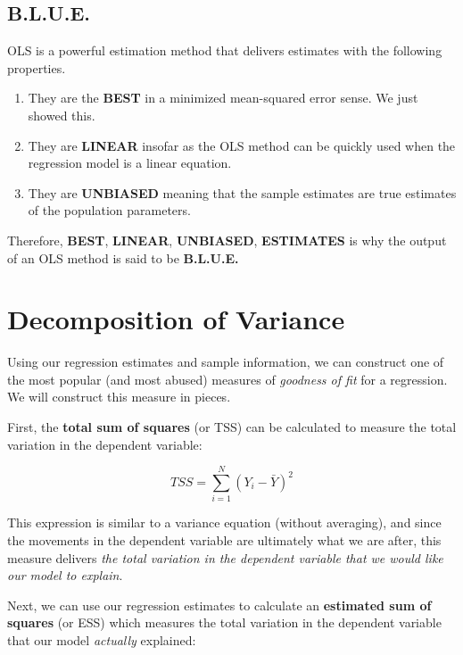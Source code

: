 \documentclass[
]{book}
\begin{document}
\hypertarget{b.l.u.e.}{%
\subsection{B.L.U.E.}\label{b.l.u.e.}}

OLS is a powerful estimation method that delivers estimates with the following properties.

\begin{enumerate}
\def\labelenumi{\arabic{enumi}.}
\item
  They are the \textbf{BEST} in a minimized mean-squared error sense. We just showed this.
\item
  They are \textbf{LINEAR} insofar as the OLS method can be quickly used when the regression model is a linear equation.
\item
  They are \textbf{UNBIASED} meaning that the sample estimates are true estimates of the population parameters.
\end{enumerate}

Therefore, \textbf{BEST}, \textbf{LINEAR}, \textbf{UNBIASED}, \textbf{ESTIMATES} is why the output of an OLS method is said to be \textbf{B.L.U.E.}

\hypertarget{decomposition-of-variance}{%
\section{Decomposition of Variance}\label{decomposition-of-variance}}

Using our regression estimates and sample information, we can construct one of the most popular (and most abused) measures of \emph{goodness of fit} for a regression. We will construct this measure in pieces.

First, the \textbf{total sum of squares} (or TSS) can be calculated to measure the total variation in the dependent variable:

\[TSS = \sum^{N}_{i=1}(Y_i - \bar{Y})^2\]

This expression is similar to a variance equation (without averaging), and since the movements in the dependent variable are ultimately what we are after, this measure delivers \emph{the total variation in the dependent variable that we would like our model to explain}.

Next, we can use our regression estimates to calculate an \textbf{estimated sum of squares} (or ESS) which measures the total variation in the dependent variable that our model \emph{actually} explained:
\end{document}
